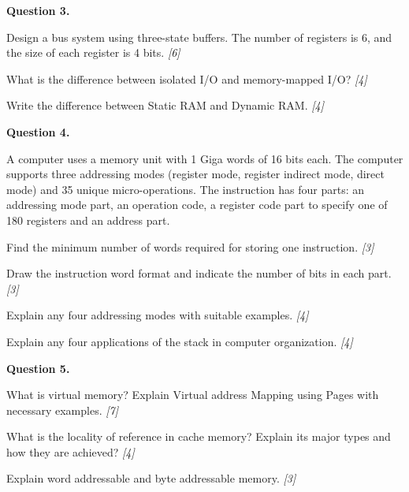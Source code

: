 \documentclass[11pt,a4paper]{article}
\newcommand{\pts}[1]{\hfill   \textit{[#1]}}
\begin{document}
\medskip


\noindent   \textbf{Question 3.}

\begin{parts}
  \item Design a bus system using three-state buffers. The number of registers is 6, and the size of each register is 4 bits. \pts{6}
  \item What is the difference between isolated I/O and memory-mapped I/O? \pts{4}
  \item Write the difference between Static RAM and Dynamic RAM. \pts{4}
\end{parts}

\medskip


\noindent   \textbf{Question 4.}

\begin{parts}
  \item A computer uses a memory unit with 1 Giga words of 16 bits each. The computer supports three addressing modes (register mode, register indirect mode, direct mode) and 35 unique micro-operations. The instruction has four parts: an addressing mode part, an operation code, a register code part to specify one of 180 registers and an address part.
  
\begin{parts}
    \item Find the minimum number of words required for storing one instruction. \pts{3}
    \item Draw the instruction word format and indicate the number of bits in each part. \pts{3}
  \end{parts}
  \item Explain any four addressing modes with suitable examples. \pts{4}
  \item Explain any four applications of the stack in computer organization. \pts{4}
\end{parts}

\medskip


\noindent   \textbf{Question 5.}

\begin{parts}
  \item What is virtual memory? Explain Virtual address Mapping using Pages with necessary examples. \pts{7}
  \item What is the locality of reference in cache memory? Explain its major types and how they are achieved? \pts{4}
  \item Explain word addressable and byte addressable memory. \pts{3}
\end{parts}
\end{document}
